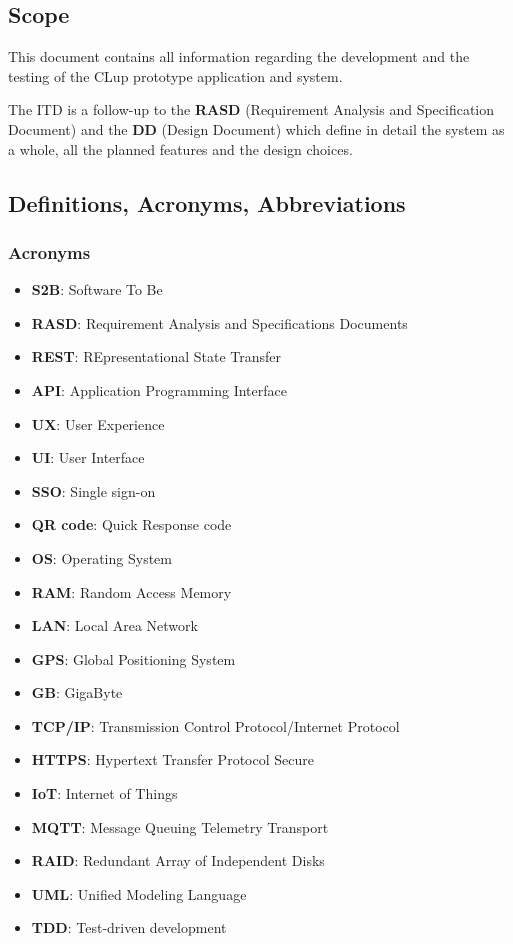 \subsection{Scope}
This document contains all information regarding the development and the testing of the CLup prototype application and system.

The ITD is a follow-up to the \textbf{RASD} (Requirement Analysis and Specification Document) and the \textbf{DD} (Design Document) which define in detail the system as a whole, all the planned features and the design choices.

\clearpage
\subsection{Definitions, Acronyms, Abbreviations}

\subsubsection{Acronyms}

\begin{itemize}
    \item \textbf{S2B}: Software To Be
    \item \textbf{RASD}: Requirement Analysis and Specifications Documents
    \item \textbf{REST}: REpresentational State Transfer
    \item \textbf{API}: Application Programming Interface
    \item \textbf{UX}: User Experience
    \item \textbf{UI}: User Interface
    \item \textbf{SSO}: Single sign-on
    \item \textbf{QR code}: Quick Response code
    \item \textbf{OS}: Operating System
    \item \textbf{RAM}: Random Access Memory
    \item \textbf{LAN}: Local Area Network
    \item \textbf{GPS}: Global Positioning System
    \item \textbf{GB}: GigaByte
    \item \textbf{TCP/IP}: Transmission Control Protocol/Internet Protocol
    \item \textbf{HTTPS}: Hypertext Transfer Protocol Secure
    \item \textbf{IoT}: Internet of Things
    \item \textbf{MQTT}: Message Queuing Telemetry Transport
    \item \textbf{RAID}: Redundant Array of Independent Disks
    \item \textbf{UML}: Unified Modeling Language
    \item \textbf{TDD}: Test-driven development
\end{itemize}

